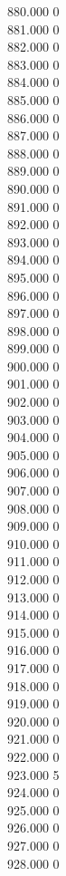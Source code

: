 { 880.000	0 \\
 881.000	0 \\
 882.000	0 \\
 883.000	0 \\
 884.000	0 \\
 885.000	0 \\
 886.000	0 \\
 887.000	0 \\
 888.000	0 \\
 889.000	0 \\
 890.000	0 \\
 891.000	0 \\
 892.000	0 \\
 893.000	0 \\
 894.000	0 \\
 895.000	0 \\
 896.000	0 \\
 897.000	0 \\
 898.000	0 \\
 899.000	0 \\
 900.000	0 \\
 901.000	0 \\
 902.000	0 \\
 903.000	0 \\
 904.000	0 \\
 905.000	0 \\
 906.000	0 \\
 907.000	0 \\
 908.000	0 \\
 909.000	0 \\
 910.000	0 \\
 911.000	0 \\
 912.000	0 \\
 913.000	0 \\
 914.000	0 \\
 915.000	0 \\
 916.000	0 \\
 917.000	0 \\
 918.000	0 \\
 919.000	0 \\
 920.000	0 \\
 921.000	0 \\
 922.000	0 \\
 923.000	5 \\
 924.000	0 \\
 925.000	0 \\
 926.000	0 \\
 927.000	0 \\
 928.000	0 \\
}

